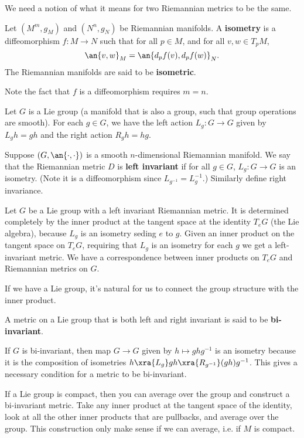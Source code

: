 We need a notion of what it means for two Riemannian metrics to be the same. 
\begin{df}
Let $(M^m,g_M)$ and $(N^n,g_N)$ be Riemannian manifolds. A \textbf{isometry} is a diffeomorphism $f:M\to N$ such that for all $p\in M$, and for all $v,w\in T_pM$, 
\[
\an{v,w}_M=\an{d_pf(v),d_pf(w)}_N.
\]
The Riemannian manifolds are said to be \textbf{isometric}.
\end{df}
Note the fact that $f$ is a diffeomorphism requires $m=n$.

\begin{df}
Let $G$ is a Lie group (a manifold that is also a group, such that group operations are smooth). For each $g\in G$, we have the left action $L_g:G\to G$ given by $L_gh=gh$ and the right action $R_gh=hg$.

Suppose $(G,\an{\cdot,\cdot})$ is a smooth $n$-dimensional Riemannian manifold. We say that the Riemannian metric $D$ is \textbf{left invariant} if for all $g\in G$, $L_g:G\to G$ is an isometry. (Note it is a diffeomorphism since $L_{g^{-1}}=L_g^{-1}$.) Similarly define right invariance.
\end{df}
Let $G$ be a Lie group with a left invariant Riemannian metric. It is determined completely by the inner product at the tangent space at the identity $T_eG$ (the Lie algebra), because $L_g$ is an isometry seding $e$ to $g$. Given an inner product on the tangent space on $T_eG$, requiring that $L_g$ is an isometry for each $g$ we get a left-invariant metric. We have a correspondence between inner products on $T_eG$ and Riemannian metrics on $G$.

If we have a Lie group, it's natural for us to connect the group structure with the inner product.
\begin{df}
A metric on a Lie group that is both left and right invariant is said to be \textbf{bi-invariant}.
\end{df}
If $G$ is bi-invariant, then map $G\to G$ given by $h\mapsto ghg^{-1}$ is an isometry because it is the composition of isometries $h\xra{L_g}gh\xra{R_{g^{-1}}} (gh)g^{-1}$.
This gives a necessary condition for a metric to be bi-invariant.

If a Lie group is compact, then you can average over the group and construct a bi-invariant metric. Take any inner product at the tangent space of the identity, look at all the other inner products that are pullbacks, and average over the group. This construction only make sense if we can average, i.e. if $M$ is compact.

